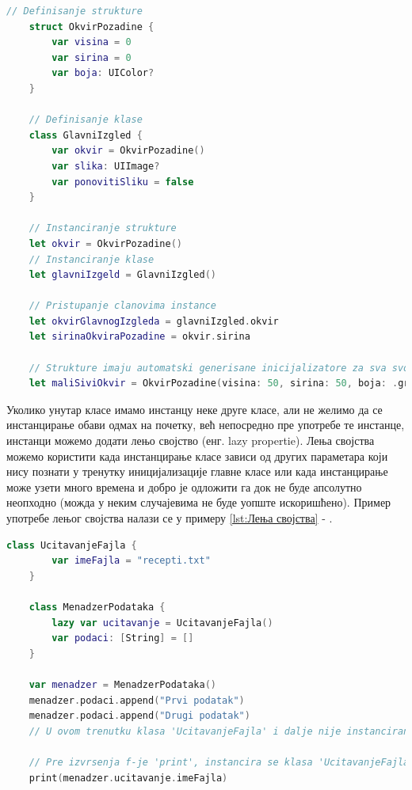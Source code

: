 \documentclass[12pt,oneside]{memoir}
\begin{document}
\begin{lstlisting}[caption=\textit{{Дефинисање класе и структуре}}, label={lst:Дефинисање класе и структуре}, language=Swift, frame=single]
    // Definisanje strukture
    struct OkvirPozadine {
        var visina = 0
        var sirina = 0
        var boja: UIColor?
    }
    
    // Definisanje klase
    class GlavniIzgled {
        var okvir = OkvirPozadine()
        var slika: UIImage?
        var ponovitiSliku = false
    }
    
    // Instanciranje strukture
    let okvir = OkvirPozadine()
    // Instanciranje klase
    let glavniIzgeld = GlavniIzgled()
    
    // Pristupanje clanovima instance
    let okvirGlavnogIzgleda = glavniIzgled.okvir
    let sirinaOkviraPozadine = okvir.sirina
    
    // Strukture imaju automatski generisane inicijalizatore za sva svojstva
    let maliSiviOkvir = OkvirPozadine(visina: 50, sirina: 50, boja: .gray)
\end{lstlisting}

\indent Уколико унутар класе имамо инстанцу неке друге класе, али не желимо да се инстанцирање обави одмах на почетку, већ непосредно пре употребе те инстанце, инстанци можемо додати лењо својство (енг. lazy propertie). Лења својства можемо користити када инстанцирање класе зависи од других параметара који нису познати у тренутку иницијализације главне класе или када инстанцирање може узети много времена и добро је одложити га док не буде апсолутно неопходно (можда у неким случајевима не буде уопште искоришћено). Пример употребе лењог својства налази се у примеру \ref{lst:Лења својства} - .

\begin{lstlisting}[caption=\textit{{Лења својства}}, label={lst:Лења својства}, language=Swift, frame=single]
    class UcitavanjeFajla {
        var imeFajla = "recepti.txt"
    }
    
    class MenadzerPodataka {
        lazy var ucitavanje = UcitavanjeFajla()
        var podaci: [String] = []
    }
    
    var menadzer = MenadzerPodataka()
    menadzer.podaci.append("Prvi podatak")
    menadzer.podaci.append("Drugi podatak")
    // U ovom trenutku klasa 'UcitavanjeFajla' i dalje nije instancirana
    
    // Pre izvrsenja f-je 'print', instancira se klasa 'UcitavanjeFajla'
    print(menadzer.ucitavanje.imeFajla)
\end{lstlisting}
\end{document}
